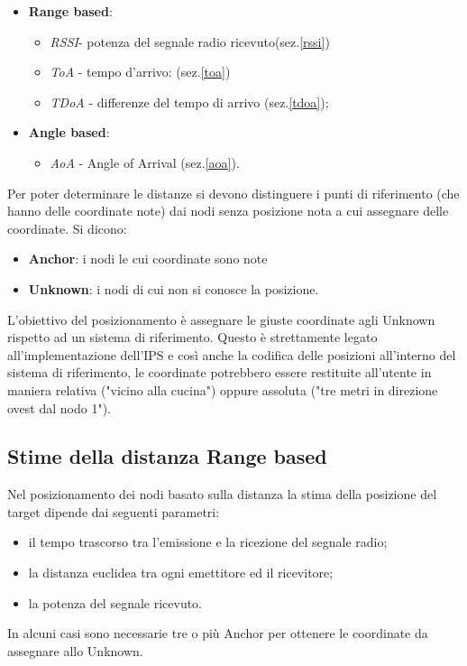 	\begin{itemize}
	\item \textbf{Range based}:
	
		\begin{itemize}
		\item \textit{RSSI}- potenza del segnale radio ricevuto(sez.\ref{rssi})
		\item \textit{ToA} - tempo d’arrivo: (sez.\ref{toa})
		\item \textit{TDoA} - differenze del tempo di arrivo (sez.\ref{tdoa});
 	    \end{itemize}
     
	\item \textbf{Angle based}:
		\begin{itemize}
			\item \textit{AoA} - Angle of Arrival (sez.\ref{aoa}).
		\end{itemize}
		
\end{itemize}
Per poter determinare le distanze si devono distinguere i punti di riferimento (che hanno
delle coordinate note) dai nodi senza posizione nota a cui assegnare delle coordinate.
Si dicono:
\begin{itemize}
	\item \textbf{Anchor}: i nodi le cui coordinate sono note
	\item \textbf{Unknown}: i nodi di cui non si conosce la posizione.
\end{itemize}

 L’obiettivo del posizionamento è assegnare le giuste coordinate agli Unknown rispetto ad un sistema di riferimento. Questo è strettamente legato all'implementazione dell'IPS e così anche la codifica delle posizioni all'interno del sistema di riferimento, le coordinate potrebbero essere restituite all'utente in maniera relativa ("vicino alla cucina") oppure assoluta ("tre  metri in direzione ovest dal nodo 1").

\subsection{Stime della distanza Range based}
Nel posizionamento dei nodi basato sulla distanza la stima della posizione del target dipende dai seguenti parametri:
	\begin{itemize}
	\item il tempo trascorso tra l’emissione e la ricezione del segnale radio;
	\item la distanza euclidea tra ogni emettitore ed il ricevitore;
	\item la potenza del segnale ricevuto.
\end{itemize}
In alcuni casi sono necessarie tre o più Anchor per ottenere le coordinate da assegnare allo Unknown.

